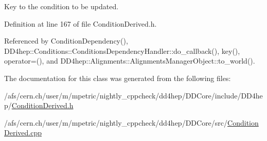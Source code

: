 Key to the condition to be updated. 

Definition at line 167 of file ConditionDerived.h.

Referenced by ConditionDependency(), DD4hep::Conditions::ConditionsDependencyHandler::do\_\-callback(), key(), operator=(), and DD4hep::Alignments::AlignmentsManagerObject::to\_\-world().

The documentation for this class was generated from the following files:\begin{DoxyCompactItemize}
\item 
/afs/cern.ch/user/m/mpetric/nightly\_\-cppcheck/dd4hep/DDCore/include/DD4hep/\hyperlink{_condition_derived_8h}{ConditionDerived.h}\item 
/afs/cern.ch/user/m/mpetric/nightly\_\-cppcheck/dd4hep/DDCore/src/\hyperlink{_condition_derived_8cpp}{ConditionDerived.cpp}\end{DoxyCompactItemize}
